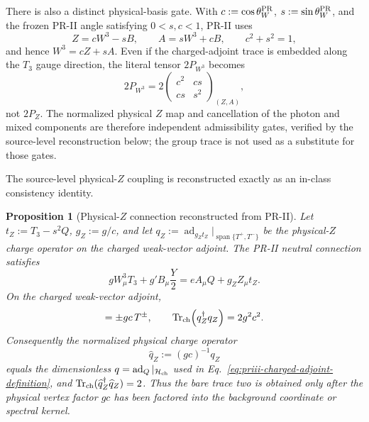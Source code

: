 \documentclass[11pt]{article}
\newtheorem{proposition}[theorem]{Proposition}
\begin{document}
There is also a distinct physical-basis gate.  With
\(c:=\cos\theta_W^{\rm PR}\), \(s:=\sin\theta_W^{\rm PR}\), and the frozen PR-II angle satisfying
\(0<s,c<1\), PR-II uses
\begin{equation}
Z=cW^3-sB,
\qquad
A=sW^3+cB,
\qquad
c^2+s^2=1,
\end{equation}
and hence \(W^3=cZ+sA\).  Even if the charged-adjoint trace is embedded along the \(T_3\) gauge
direction, the literal tensor \(2P_{W^3}\) becomes
\begin{equation}
2P_{W^3}
=
2\begin{pmatrix}
c^2 & cs\\
cs & s^2
\end{pmatrix}_{(Z,A)},
\label{eq:priii-w3-to-physical-neutral-map}
\end{equation}
not \(2P_Z\).  The normalized physical \(Z\) map and cancellation of the photon
and mixed components are therefore independent admissibility gates, verified
by the source-level reconstruction below; the group trace is not used as a
substitute for those gates.

The source-level physical-\(Z\) coupling is reconstructed exactly as an
in-class consistency identity.

\begin{proposition}[Physical-\(Z\) connection reconstructed from PR-II]
\label{prop:priii-physical-z-connection}
Let \(t_Z:=T_3-s^2Q\), \(g_Z:=g/c\), and let
\(q_Z:=\operatorname{ad}_{g_Zt_Z}|_{\operatorname{span}\{T^+,T^-\}}\) be the
physical-\(Z\) charge operator on the charged weak-vector adjoint.  The PR-II neutral connection
satisfies
\begin{equation}
gW_\mu^3T_3+g'B_\mu\frac{Y}{2}
=
eA_\mu Q+g_ZZ_\mu t_Z .
\label{eq:priii-physical-z-connection}
\end{equation}
On the charged weak-vector adjoint,
\begin{equation}
[g_Zt_Z,T^\pm]=\pm gc\,T^\pm,
\qquad
\operatorname{Tr}_{\rm ch}
\!\left(q_Z^\dagger q_Z\right)
=2g^2c^2.
\label{eq:priii-physical-z-vector-trace}
\end{equation}
Consequently the normalized physical charge operator
\begin{equation}
\widehat q_Z:=(gc)^{-1}q_Z
\end{equation}
equals the dimensionless \(q=\operatorname{ad}_Q|_{\mathcal H_{\rm ch}}\) used in
Eq.~\eqref{eq:priii-charged-adjoint-definition}, and
\(\operatorname{Tr}_{\rm ch}(\widehat q_Z^\dagger\widehat q_Z)=2\).
Thus the bare trace two is obtained only after the physical vertex factor \(gc\) has been
factored into the background coordinate or spectral kernel.
\end{proposition}
\end{document}
